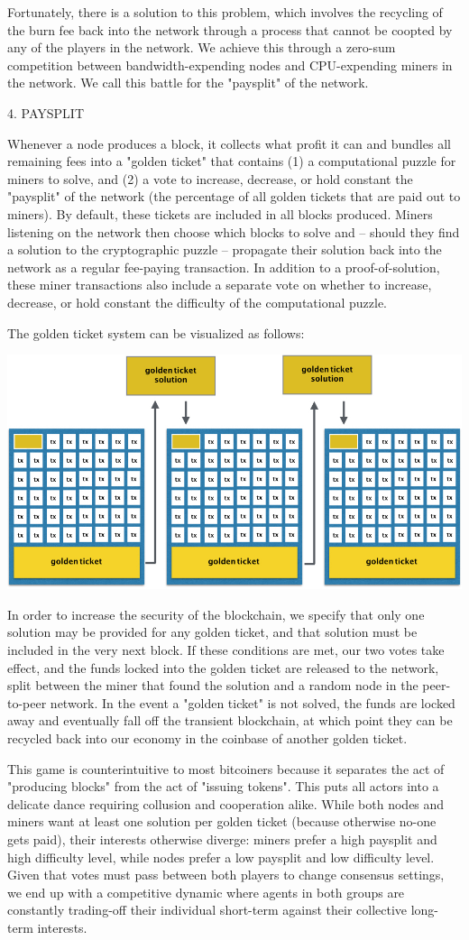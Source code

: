 \documentclass[11.5pt, oneside]{article}   	%
\begin{document}
\begin{multicols}{2}
Fortunately, there is a solution to this problem, which involves the recycling of the burn fee back into the network through a process that cannot be coopted by any of the players in the network. We achieve this through a zero-sum competition between bandwidth-expending nodes and CPU-expending miners in the network. We call this battle for the "paysplit" of the network.

4. PAYSPLIT

Whenever a node produces a block, it collects what profit it can and bundles all remaining fees into a "golden ticket" that contains (1) a computational puzzle for miners to solve, and (2) a vote to increase, decrease, or hold constant the "paysplit" of the network (the percentage of all golden tickets that are paid out to miners). By default, these tickets are included in all blocks produced. Miners listening on the network then choose which blocks to solve and -- should they find a solution to the cryptographic puzzle -- propagate their solution back into the network as a regular fee-paying transaction. In addition to a proof-of-solution, these miner transactions also include a separate vote on whether to increase, decrease, or hold constant the difficulty of the computational puzzle.

The golden ticket system can be visualized as follows:

\includegraphics[width=.45\textwidth]{saito7.jpeg}

In order to increase the security of the blockchain, we specify that only one solution may be provided for any golden ticket, and that solution must be included in the very next block. If these conditions are met, our two votes take effect, and the funds locked into the golden ticket are released to the network, split between the miner that found the solution and a random node in the peer-to-peer network. In the event a "golden ticket" is not solved, the funds are locked away and eventually fall off the transient blockchain, at which point they can be recycled back into our economy in the coinbase of another golden ticket. 

This game is counterintuitive to most bitcoiners because it separates the act of "producing blocks" from the act of "issuing tokens". This puts all actors into a delicate dance requiring collusion and cooperation alike. While both nodes and miners want at least one solution per golden ticket (because otherwise no-one gets paid), their interests otherwise diverge: miners prefer a high paysplit and high difficulty level, while nodes prefer a low paysplit and low difficulty level. Given that votes must pass between both players to change consensus settings, we end up with a competitive dynamic where agents in both groups are constantly trading-off their individual short-term against their collective long-term interests.


\end{multicols}
\end{document}
